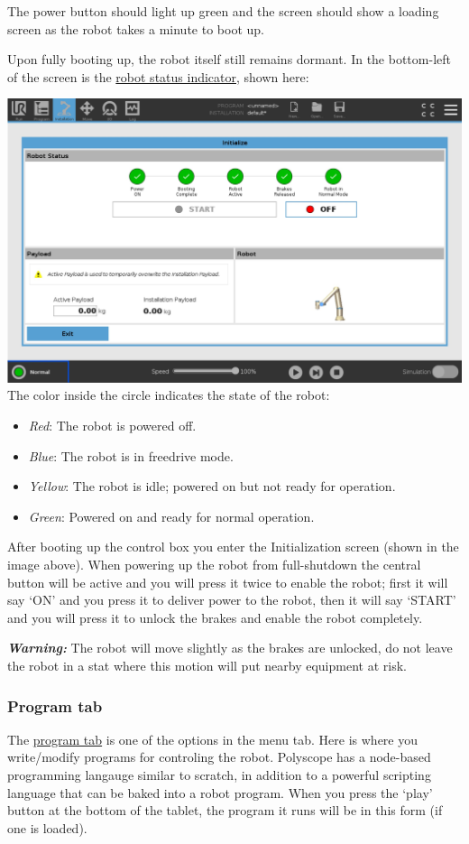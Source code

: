 \documentclass[11pt]{article}
\begin{document}
The power button should light up green and the screen should show a loading screen as the robot takes a minute to boot up.

Upon fully booting up, the robot itself still remains dormant. In the bottom-left of the screen is the \uline{robot status indicator}, shown here:

\begin{center}
\includegraphics[width=.9\linewidth]{figures/robot_state_menu.jpg}
The color inside the circle indicates the state of the robot:
\end{center}
\begin{itemize}
    \item \emph{Red}: The robot is powered off.
    \item \emph{Blue}: The robot is in freedrive mode.
    \item \emph{Yellow}: The robot is idle; powered on but not ready for operation.
    \item \emph{Green}: Powered on and ready for normal operation.
\end{itemize}

After booting up the control box you enter the Initialization screen (shown in the image above). When powering up the robot from full-shutdown the central button will be active and you will press it twice to enable the robot; first it will say `ON' and you press it to deliver power to the robot, then it will say `START' and you will press it to unlock the brakes and enable the robot completely.

\textit{\textbf{Warning:}} The robot will move slightly as the brakes are unlocked, do not leave the robot in a stat where this motion will put nearby equipment at risk.

\subsubsection{Program tab}
The \hyperlink{https://s3-eu-west-1.amazonaws.com/ur-support-site/44018/Software_Manual_en_Global.pdf\#page=103}{program tab} is one of the options in the menu tab. Here is where you write/modify programs for controling the robot.
Polyscope has a node-based programming langauge similar to scratch, in addition to a powerful scripting language that can be baked into a robot program.
When you press the `play' button at the bottom of the tablet, the program it runs will be in this form (if one is loaded).
\end{document}
